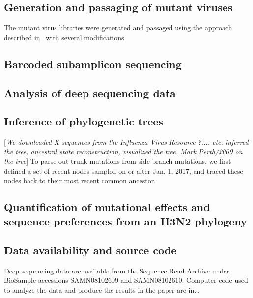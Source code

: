 \documentclass[9pt,twocolumn,twoside]{pnas-new}
\newcommand{\comment}[1]{{\color{red}[\textsl{#1}]}}
\begin{document}
{\subsection*{Generation and passaging of mutant viruses}
The mutant virus libraries were generated and passaged using the approach described in~\cite{doud2016accurate} with several modifications.

\subsection*{Barcoded subamplicon sequencing}

\subsection*{Analysis of deep sequencing data}

\subsection*{Inference of phylogenetic trees}
\comment{We downloaded X sequences from the Influenza Virus Resource ?.... etc. inferred the tree, ancestral state reconstruction, visualized the tree. Mark Perth/2009 on the tree}
To parse out trunk mutations from side branch mutations, we first defined a set of recent nodes sampled on or after Jan. 1, 2017, and traced these nodes back to their most recent common ancestor. 

\subsection*{Quantification of mutational effects and sequence preferences from an H3N2 phylogeny}

\subsection*{Data availability and source code}
Deep sequencing data are available from the Sequence Read Archive under BioSample accessions SAMN08102609 and SAMN08102610. Computer code used to analyze the data and produce the results in the paper are in...
}

\showmatmethods{} %


\showacknow{} %
\end{document}
